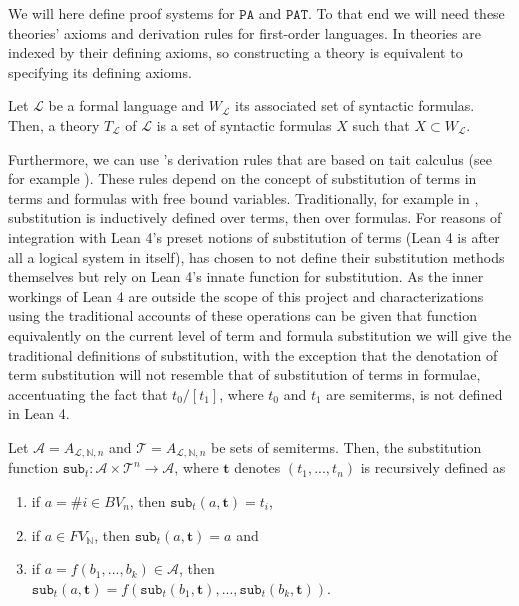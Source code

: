 We will here define proof systems for $\texttt{PA}$ and $\texttt{PAT}$. To that end we will need these theories' axioms and derivation rules for first-order languages. In \cite{ffl} theories are indexed by their defining axioms, so constructing a theory is equivalent to specifying its defining axioms. 

\begin{definition}[theory]\label{def:theory}
    \leanok
    Let $\mathcal{L}$ be a formal language and $W_{\mathcal{L}}$ its associated set of syntactic formulas. Then, a theory $T_{\mathcal{L}}$ of $\mathcal{L}$ is a set of syntactic formulas $X$ such that $X \subset W_{\mathcal{L}}$.
\end{definition}

Furthermore, we can use \cite{ffl}'s derivation rules that are based on tait calculus (see for example \cite{lee2007}). These rules depend on the concept of substitution of terms in terms and formulas with free bound variables. Traditionally, for example in \cite{negri2001}, substitution is inductively defined over terms, then over formulas. For reasons of integration with Lean 4's preset notions of substitution of terms (Lean 4 is after all a logical system in itself), \cite{ffl} has chosen to not define their substitution methods themselves but rely on Lean 4's innate function for substitution. As the inner workings of Lean 4 are outside the scope of this project and characterizations using the traditional accounts of these operations can be given that function equivalently on the current level of term and formula substitution we will give the traditional definitions of substitution, with the exception that the denotation of term substitution will not resemble that of substitution of terms in formulae, accentuating the fact that $t_0/[t_1]$, where $t_0$ and $t_1$ are semiterms, is not defined in Lean 4.

\begin{definition}\label{def:sub-t}
    \leanok
    Let $\mathcal{A} = A_{\mathcal{L},\mathbb{N},n}$ and $\mathcal{T} = A_{\mathcal{L},\mathbb{N},n}$ be sets of semiterms. Then, the substitution function $\texttt{sub}_t : \mathcal{A} \times \mathcal{T}^n \to \mathcal{A}$, where $\textbf{t}$ denotes $(t_1,...,t_n)$ is recursively defined as
    \begin{enumerate}
        \item if $a = \#i \in BV_n$, then $\texttt{sub}_t(a,\textbf{t}) = t_i$,
        \item if $a \in FV_{\mathbb{N}}$, then $\texttt{sub}_t(a,\textbf{t}) = a$ and
        \item if $a = f(b_1,...,b_k) \in \mathcal{A}$, then $\texttt{sub}_t(a,\textbf{t}) = f(\texttt{sub}_t(b_1,\textbf{t}),...,\texttt{sub}_t(b_k,\textbf{t}))$. 
    \end{enumerate}
\end{definition}


